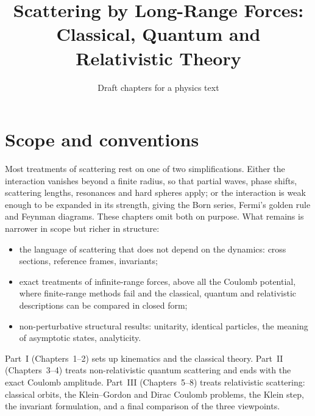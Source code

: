 \documentclass[11pt,a4paper]{book}
\title{Scattering by Long-Range Forces:\\[2pt]
       Classical, Quantum and Relativistic Theory}
\author{Draft chapters for a physics text}
\date{}
\numberwithin{equation}{chapter}
\begin{document}
\frontmatter
\maketitle
\tableofcontents

\chapter*{Scope and conventions}

Most treatments of scattering rest on one of two simplifications. Either the
interaction vanishes beyond a finite radius, so that partial waves, phase
shifts, scattering lengths, resonances and hard spheres apply; or the
interaction is weak enough to be expanded in its strength, giving the Born
series, Fermi's golden rule and Feynman diagrams. These chapters omit both on
purpose. What remains is narrower in scope but richer in structure:
\begin{itemize}
  \item the language of scattering that does not depend on the dynamics:
        cross sections, reference frames, invariants;
  \item exact treatments of infinite-range forces, above all the Coulomb
        potential, where finite-range methods fail and the classical, quantum
        and relativistic descriptions can be compared in closed form;
  \item non-perturbative structural results: unitarity, identical particles,
        the meaning of asymptotic states, analyticity.
\end{itemize}

Part~I (Chapters~1--2) sets up kinematics and the classical theory.
Part~II (Chapters~3--4) treats non-relativistic quantum scattering and ends
with the exact Coulomb amplitude. Part~III (Chapters~5--8) treats relativistic
scattering: classical orbits, the Klein--Gordon and Dirac Coulomb problems, the
Klein step, the invariant formulation, and a final comparison of the three
viewpoints.
\end{document}
